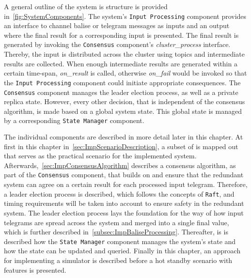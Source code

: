 A general outline of the system is structure is provided in~\autoref{fig:SystemComponents}.
The system's \texttt{Input Processing} component provides an interface to channel balise or  telegram messages as inputs and an output where the final result for a corresponding input is presented.
The final result is generated by invoking the \texttt{Consensus} component's \textit{cluster\_process} interface.
Thereby, the input is distributed across the cluster using  topics and intermediate results are collected.
When enough intermediate results are generated within a certain time-span, \textit{on\_result} is called, otherwise \textit{on\_fail} would be invoked so that the \texttt{Input Processing} component could initiate appropriate consequences.
The \texttt{Consensus} component manages the leader election process, as well as a private replica state.
However, every other decision, that is independent of the consensus algorithm, is made based on a global system state.
This global state is managed by a corresponding \texttt{State Manager} component.

The individual components are described in more detail later in this chapter.
At first in this chapter in~\autoref{sec:ImpScenarioDescription}, a subset of  is mapped out that serves as the practical scenario for the implemented system.
Afterwards,~\autoref{sec:ImpConsensusAlgorithm} describes a consensus algorithm, as part of the \texttt{Consensus} component, that builds on  and ensure that the redundant system can agree on a certain result for each processed input telegram.
Therefore, a leader election process is described, which follows the concepts of \texttt{Raft}, and timing requirements will be taken into account to ensure safety in the redundant system.
The leader election process lays the foundation for the way of how input telegrams are spread across the system and merged into a single final value, which is further described in~\autoref{subsec:ImpBaliseProcessing}.
Thereafter, is is described how the \texttt{State Manager} component manages the system's state and how the state can be updated and queried.
Finally in this chapter, an approach for implementing a simulator is described before a hot standby scenario with  features is presented.

